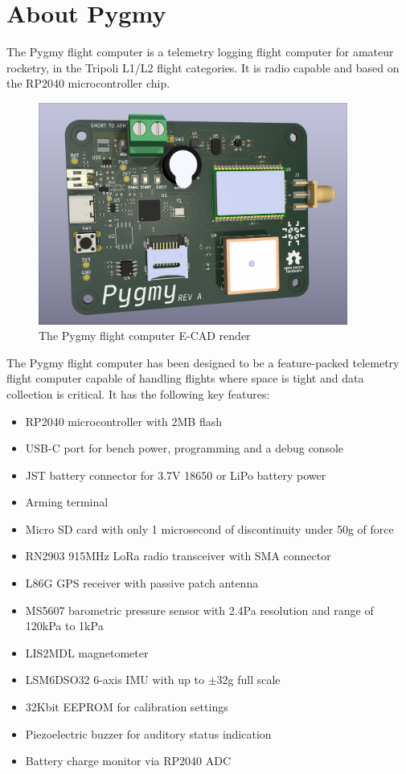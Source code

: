 \section{About Pygmy}

The Pygmy flight computer is a telemetry logging flight computer for amateur rocketry, in the Tripoli L1/L2 flight
categories. It is radio capable and based on the RP2040 microcontroller chip.

\begin{figure}[H]
    \centering
    \includegraphics[width=4in]{../assets/pygmy.png}
    \caption{The Pygmy flight computer E-CAD render}
\end{figure}

The Pygmy flight computer has been designed to be a feature-packed telemetry flight computer capable of handling
flights where space is tight and data collection is critical. It has the following key features:

\begin{itemize}
    \item RP2040 microcontroller with 2MB flash
    \item USB-C port for bench power, programming and a debug console
    \item JST battery connector for 3.7V 18650 or LiPo battery power
    \item Arming terminal
    \item Micro SD card with only 1 microsecond of discontinuity under 50g of force
    \item RN2903 915MHz LoRa radio transceiver with SMA connector
    \item L86G GPS receiver with passive patch antenna
    \item MS5607 barometric pressure sensor with 2.4Pa resolution and range of 120kPa to 1kPa
    \item LIS2MDL magnetometer
    \item LSM6DSO32 6-axis IMU with up to $\pm$32g full scale
    \item 32Kbit EEPROM for calibration settings
    \item Piezoelectric buzzer for auditory status indication
    \item Battery charge monitor via RP2040 ADC
\end{itemize}
